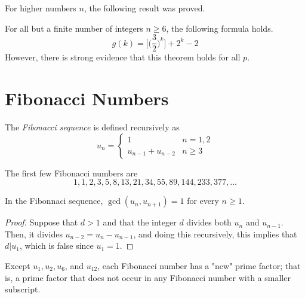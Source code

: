 \documentclass{article}
\newcounter{theorem}[section]
\newcounter{definition}[section]
\begin{document}
For higher numbers $n$, the following result was proved. 

\begin{theorem}
  \label{thm:formula-for-gk}
For all but a finite number of integers $n \geq 6$, the following formula holds. 
\begin{equation}
  g(k) = \bigg[ \bigg( \frac{3}{2} \bigg)^k \bigg] + 2^k - 2
\end{equation}
However, there is strong evidence that this theorem holds for all $p$. 
\end{theorem}

\section{Fibonacci Numbers}

\begin{definition}
  \label{def:fibonacci-sequence}
The \textit{Fibonacci sequence} is defined recursively as 
\begin{equation}
  u_n = \begin{cases}
  1 & n = 1, 2 \\
  u_{n-1} + u_{n-2} & n \geq 3
  \end{cases}
\end{equation}
\end{definition}

The first few Fibonacci numbers are
\begin{equation}
  1, 1, 2, 3, 5, 8, 13, 21, 34, 55, 89, 144, 233, 377, ...
\end{equation}

\begin{theorem}
  \label{thm:consecutive-fibonacci-numbers-are-coprime}
In the Fibonnaci sequence, $\gcd(u_n, u_{n+1}) = 1$ for every $n\geq 1$. 
\end{theorem}
\begin{proof}
Suppose that $d >1 $ and that the integer $d$ divides both $u_n$ and $u_{n-1}$. Then, it divides $u_{n-2} = u_n - u_{n-1}$, and doing this recursively, this implies that $d | u_1$, which is false since $u_1 = 1$.
\end{proof}

\begin{theorem}
  \label{thm:carmichaels-theorem-on-primitive-prime-factors}
Except $u_1, u_2, u_6$, and $u_{12}$, each Fibonacci number has a "new" prime factor; that is, a prime factor that does not occur in any Fibonacci number with a smaller subscript. 
\end{theorem}
\end{document}
